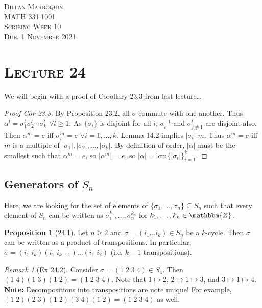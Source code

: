 \documentclass{article}
\newcommand{\Z}{\mathbbm{Z}}
\newcommand{\inverse}[1]{#1^{-1}}
\newcommand{\lcm}{\mathrm{lcm}}
\renewcommand{\Subset}{\subseteq}
\theoremstyle{definition}
\newtheorem*{prop}{Proposition}
\theoremstyle{remark}
\newtheorem*{rmk}{Remark}
\begin{document}
    \begin{center}
        \textsc{Dillan Marroquin\\MATH 331.1001\\Scribing Week 10\\Due. 1 November 2021\\}
    \end{center}
        
    \section*{\textbf{\textsc{Lecture 24}}}{
        We will begin with a proof of Corollary 23.3 from last lecture\ldots
        \begin{proof}[Proof Cor 23.3]
            By Proposition 23.2, all $\sigma$ commute with one another. Thus $\alpha^l=\sigma_1^l\sigma_2^l\cdots\sigma_k^l$ $\forall l\geq 1$. As $\{\sigma_i\}$ is disjoint for all $i$, $\inverse{\sigma_i}$ and $\sigma_{j\neq1}^l$ are disjoint also. Then $\alpha^m=e$ iff $\sigma_i^m=e$ $\forall i=1,\ldots,k$. Lemma 14.2 implies $|\sigma_i|\big|m$. Thus $\alpha^m=e$ iff $m$ is a multiple of $|\sigma_1|,|\sigma_2|,\ldots,|\sigma_k|$. By definition of order, $|\alpha|$ must be the smallest such that $\alpha^m=e$, so $|\alpha^m|=e$, so $|\alpha|=\lcm\{|\sigma_i|\}_{i=1}^k$.
        \end{proof}
        
        \subsection*{Generators of $S_n$}{
            Here, we are looking for the set of elements of $\{\sigma_1,\ldots,\sigma_n\}\Subset S_n$ such that every element of $S_n$ can be written as $\sigma_1^{k_1},\ldots,\sigma_n^{k_n}$ for $k_1,\ldots,k_n \in \Z$.
        
            \begin{prop}[24.1]
                Let $n\geq 2$ and $\sigma=(i_1\ldots i_k)\in S_n$ be a $k$-cycle. Then $\sigma$ can be written as a product of transpositions. In particular, $\sigma=(i_1\;i_k)(i_1\;i_{k-1})\ldots(i_1\;i_2)$ (i.e. $k-1$ transpositions).
            \end{prop}
            
            \begin{rmk}[Ex 24.2]
                Consider $\sigma=(1\;2\;3\;4)\in S_4$. Then $(1\;4)(1\;3)(1\;2)=(1\;2\;3\;4)$. Note that $1\mapsto2$, $2\mapsto1\mapsto3$, and $3\mapsto1\mapsto4$.\\
                \textbf{Note:} Decompositions into transpositions are note unique! For example, $(1\;2)(2\;3)(1\;2)(3\;4)(1\;2)=(1\;2\;3\;4)$ as well.
            \end{rmk}
            
}}
\end{document}
